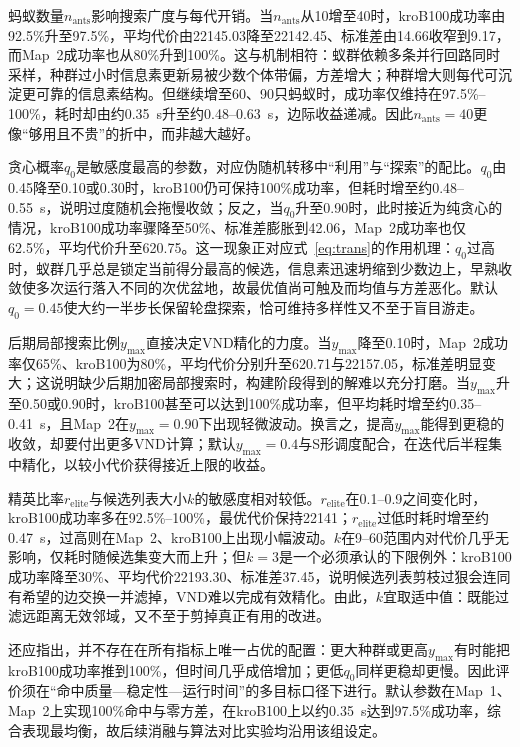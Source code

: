 \documentclass[lettersize,journal]{IEEEtran}
\begin{document}
蚂蚁数量$n_{\mathrm{ants}}$影响搜索广度与每代开销。当$n_{\mathrm{ants}}$从10增至40时，kroB100成功率由92.5\%升至97.5\%，平均代价由22145.03降至22142.45、标准差由14.66收窄到9.17，而Map~2成功率也从80\%升到100\%。这与机制相符：蚁群依赖多条并行回路同时采样，种群过小时信息素更新易被少数个体带偏，方差增大；种群增大则每代可沉淀更可靠的信息素结构。但继续增至60、90只蚂蚁时，成功率仅维持在97.5\%--100\%，耗时却由约0.35~s升至约0.48--0.63~s，边际收益递减。因此$n_{\mathrm{ants}}=40$更像“够用且不贵”的折中，而非越大越好。

贪心概率$q_0$是敏感度最高的参数，对应伪随机转移中“利用”与“探索”的配比。$q_0$由0.45降至0.10或0.30时，kroB100仍可保持100\%成功率，但耗时增至约0.48--0.55~s，说明过度随机会拖慢收敛；反之，当$q_0$升至0.90时，此时接近为纯贪心的情况，kroB100成功率骤降至50\%、标准差膨胀到42.06，Map~2成功率也仅62.5\%，平均代价升至620.75。这一现象正对应式~\textcolor{blue}{\eqref{eq:trans}}的作用机理：$q_0$过高时，蚁群几乎总是锁定当前得分最高的候选，信息素迅速坍缩到少数边上，早熟收敛使多次运行落入不同的次优盆地，故最优值尚可触及而均值与方差恶化。默认$q_0=0.45$使大约一半步长保留轮盘探索，恰可维持多样性又不至于盲目游走。

后期局部搜索比例$y_{\max}$直接决定VND精化的力度。当$y_{\max}$降至0.10时，Map~2成功率仅65\%、kroB100为80\%，平均代价分别升至620.71与22157.05，标准差明显变大；这说明缺少后期加密局部搜索时，构建阶段得到的解难以充分打磨。当$y_{\max}$升至0.50或0.90时，kroB100甚至可以达到100\%成功率，但平均耗时增至约0.35--0.41~s，且Map~2在$y_{\max}=0.90$下出现轻微波动。换言之，提高$y_{\max}$能得到更稳的收敛，却要付出更多VND计算；默认$y_{\max}=0.4$与S形调度配合，在迭代后半程集中精化，以较小代价获得接近上限的收益。

精英比率$r_{\mathrm{elite}}$与候选列表大小$k$的敏感度相对较低。$r_{\mathrm{elite}}$在0.1--0.9之间变化时，kroB100成功率多在92.5\%--100\%，最优代价保持22141；$r_{\mathrm{elite}}$过低时耗时增至约0.47~s，过高则在Map~2、kroB100上出现小幅波动。$k$在9--60范围内对代价几乎无影响，仅耗时随候选集变大而上升；但$k=3$是一个必须承认的下限例外：kroB100成功率降至30\%、平均代价22193.30、标准差37.45，说明候选列表剪枝过狠会连同有希望的边交换一并滤掉，VND难以完成有效精化。由此，$k$宜取适中值：既能过滤远距离无效邻域，又不至于剪掉真正有用的改进。

还应指出，并不存在在所有指标上唯一占优的配置：更大种群或更高$y_{\max}$有时能把kroB100成功率推到100\%，但时间几乎成倍增加；更低$q_0$同样更稳却更慢。因此评价须在“命中质量—稳定性—运行时间”的多目标口径下进行。默认参数在Map~1、Map~2上实现100\%命中与零方差，在kroB100上以约0.35~s达到97.5\%成功率，综合表现最均衡，故后续消融与算法对比实验均沿用该组设定。
\end{document}
